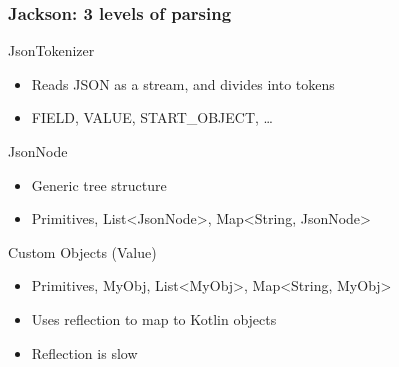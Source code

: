 \documentclass{beamer}
\begin{document}
    \begin{frame}
        \frametitle{Jackson: 3 levels of parsing}

        \begin{block}{JsonTokenizer}
            \begin{itemize}
                \item Reads JSON as a stream, and divides into tokens
                \item FIELD, VALUE, START\_OBJECT, \ldots
            \end{itemize}
        \end{block}

        \begin{block}{JsonNode}
            \begin{itemize}
                \item Generic tree structure
                \item Primitives, List<JsonNode>, Map<String, JsonNode>
            \end{itemize}
        \end{block}

        \begin{block}{Custom Objects (Value)}
            \begin{itemize}
                \item Primitives, MyObj, List<MyObj>, Map<String, MyObj>
                \item Uses reflection to map to Kotlin objects
                \item Reflection is slow
            \end{itemize}
        \end{block}
    \end{frame}


\end{document}
